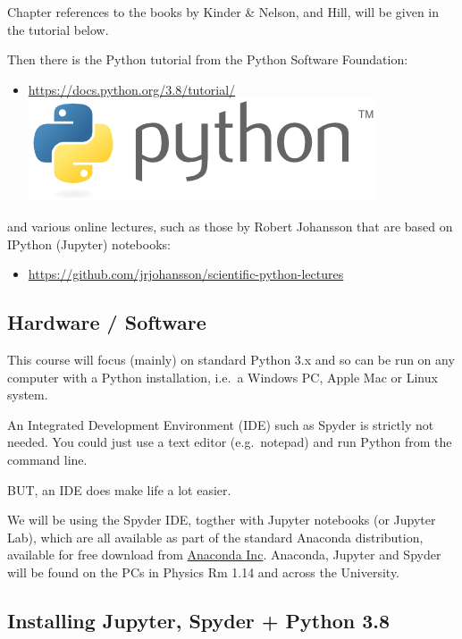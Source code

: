 \documentclass[10pt]{article}
\providecommand{\tightlist}{%
      \setlength{\itemsep}{0pt}\setlength{\parskip}{0pt}}
\begin{document}
Chapter references to the books by Kinder \& Nelson, and Hill, will be
given in the tutorial below.

Then there is the Python tutorial from the Python Software Foundation:

\begin{itemize}
\tightlist
\item
 \href{https://docs.python.org/3.8/tutorial/}{https://docs.python.org/3.8/tutorial/ } \includegraphics[scale=0.3]{python-logo.png}
\end{itemize}

and various online lectures, such as those by Robert Johansson that are
based on IPython (Jupyter) notebooks:

\begin{itemize}
\tightlist
\item
 \href{https://github.com/jrjohansson/scientific-python-lectures}{https://github.com/jrjohansson/scientific-python-lectures} 
\end{itemize}

    \hypertarget{hardware-software}{%
\subsection{Hardware / Software}\label{hardware-software}}

This course will focus (mainly) on standard Python 3.x and so can be run
on any computer with a Python installation, i.e.~a Windows PC, Apple Mac
or Linux system.

An Integrated Development Environment (IDE) such as Spyder is strictly
not needed. You could just use a text editor (e.g.~notepad) and run
Python from the command line.

BUT, an IDE does make life a lot easier.

We will be using the Spyder IDE, togther with Jupyter notebooks (or
Jupyter Lab), which are all available as part of the standard Anaconda
distribution, available for free download from
\href{https://www.anaconda.com/downloads}{Anaconda Inc}. Anaconda,
Jupyter and Spyder will be found on the PCs in Physics Rm 1.14 and
across the University.

    \hypertarget{installing-jupyter-spyder-python-3.8}{%
\subsection{Installing Jupyter, Spyder + Python
3.8}\label{installing-jupyter-spyder-python-3.8}}
\end{document}
